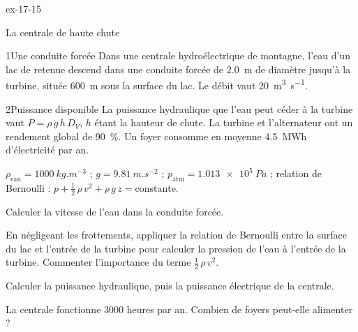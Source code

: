 \begin{blocLivre}{ex-17-15}
\begin{exercice}[3]{La centrale de haute chute}
\begin{docu}{1}{Une conduite forcée}
Dans une centrale hydroélectrique de montagne, l'eau d'un lac de retenue descend dans une conduite forcée de
\qty{2,0}{m} de diamètre jusqu'à la turbine, située \qty{600}{m} sous la surface du lac. Le débit vaut
\qty{20}{m^3.s^{-1}}.
\end{docu}
\begin{docu}{2}{Puissance disponible}
La puissance hydraulique que l'eau peut céder à la turbine vaut $P=\rho\,g\,h\,D_V$, $h$ étant la hauteur de chute. La
turbine et l'alternateur ont un rendement global de 90~\%. Un foyer consomme en moyenne \qty{4,5}{MWh} d'électricité
par an.
\end{docu}
\begin{donnees}
$\rho_\mathrm{eau}=\qty{1000}{kg.m^{-3}}$ ; $g=\qty{9,81}{m.s^{-2}}$ ; $p_\mathrm{atm}=\qty{1,013e5}{Pa}$ ; relation de Bernoulli :
$p+\frac12\,\rho\,v^2+\rho\,g\,z=\text{constante}$.
\end{donnees}
\begin{questions}
\item Calculer la vitesse de l'eau dans la conduite forcée.
\item En négligeant les frottements, appliquer la relation de Bernoulli entre la surface du lac et l'entrée de la
turbine pour calculer la pression de l'eau à l'entrée de la turbine. Commenter l'importance du terme
$\frac12\,\rho\,v^2$.
\item Calculer la puissance hydraulique, puis la puissance électrique de la centrale.
\item \initiative La centrale fonctionne \num{3000} heures par an. Combien de foyers peut-elle alimenter ?
\end{questions}
\end{exercice}
\end{blocLivre}
